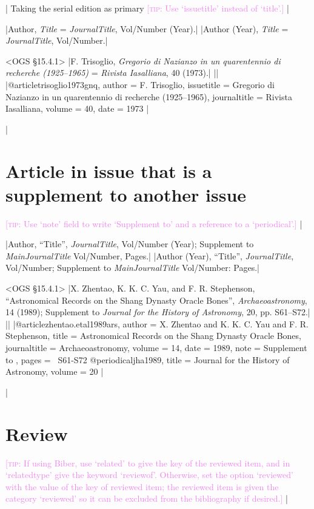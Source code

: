 \documentclass[extrafontsizes,11pt,a4paper,oneside]{memoir}
\newcommand*{\lit}[1]{\textsf{#1}}
\newcommand*{\code}[1]{`\textsf{#1}'}
\newcommand*{\aside}[1]{\textcolor{violet}{[\textsc{tip:} #1]}}
\begin{document}
\todoc|
Taking the serial edition as primary \aside{Use \code{issuetitle} instead of \code{title}.}
|

\specs
|Author, \emph{Title} = \emph{JournalTitle}, Vol/Number (Year).|%
|Author (Year), \emph{Title} = \emph{JournalTitle}, Vol/Number.|

\bibexample<OGS \S15.4.1>
|F. Trisoglio, \emph{Gregorio di Nazianzo in un quarentennio di recherche (1925--1965)} = \emph{Rivista Iasalliana}, 40 (1973).|%
||%
|@article{trisoglio1973gnq,
  author = {F. Trisoglio},
  issuetitle = {Gregorio di Nazianzo in un quarentennio di recherche (1925--1965)},
  journaltitle = {Rivista Iasalliana},
  volume = {40},
  date = {1973}
}|
  
\todoc|
\section{Article in issue that is a supplement to another issue}

\aside{Use \code{note} field to write ‘Supplement to’ and a reference to a \code{periodical}.}
|

\specs
|Author, \enquote{Title}, \emph{JournalTitle}, Vol/Number (Year); \lit{Supplement to} \emph{MainJournalTitle} Vol/Number, Pages.|%
|Author (Year), \enquote{Title}, \emph{JournalTitle}, Vol/Number; \lit{Supplement to} \emph{MainJournalTitle} Vol/Number: Pages.|

\bibexample<OGS \S15.4.1>
|X. Zhentao, K. K. C. Yau, and F. R. Stephenson, \enquote{Astronomical Records on the Shang Dynasty Oracle Bones}, \emph{Archaeoastronomy}, 14 (1989); Supplement to \emph{Journal for the History of Astronomy}, 20, pp. S61--S72.|%
||%
|@article{zhentao.etal1989ars,
  author = {X. Zhentao and K. K. C. Yau and F. R. Stephenson},
  title = {Astronomical Records on the Shang Dynasty Oracle Bones},
  journaltitle = {Archaeoastronomy},
  volume = {14},
  date = {1989},
  note = {Supplement to },
  pages = {\ppno~S61-S72}
}
@periodical{jha1989,
  title = {Journal for the History of Astronomy},
  volume = {20}
}|
  
\todoc|
\section{Review}

\aside{If using Biber, use \code{related} to give the key of the reviewed item, and in \code{relatedtype} give the keyword \code{reviewof}. Otherwise, set the option \code{reviewed} with the value of the key of reviewed item; the reviewed item is given the category \code{reviewed} so it can be excluded from the bibliography if desired.}
|
\end{document}
